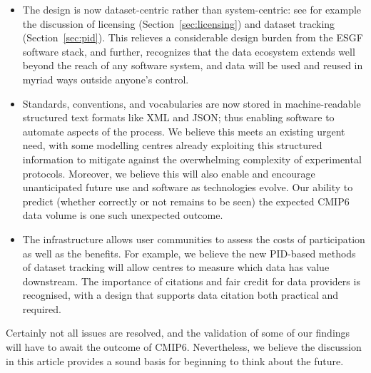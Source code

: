 \documentclass[gmd,manuscript]{copernicus}
\newcommand{\secref}[1] {\mbox{Section  \ref{sec:#1}}}
\begin{document}
\begin{itemize}
\item The design is now dataset-centric rather than system-centric:
  see for example the discussion of licensing (\secref{licensing}) and
  dataset tracking (\secref{pid}). This relieves a considerable design
  burden from the ESGF software stack, and further, recognizes that
  the data ecosystem extends well beyond the reach of any software
  system, and data will be used and reused in myriad ways outside
  anyone's control.
\item Standards, conventions, and vocabularies are now stored in
  machine-readable structured text formats like XML and JSON; thus
  enabling software to automate aspects of the process. We believe
  this meets an existing urgent need, with some modelling centres
  already exploiting this structured information to mitigate against
  the overwhelming complexity of experimental protocols. Moreover, we
  believe this will also enable and encourage unanticipated future use
  and software as technologies evolve. Our ability to predict (whether
  correctly or not remains to be seen) the expected CMIP6 data volume
  is one such unexpected outcome.
\item The infrastructure allows user communities to assess the costs
  of participation as well as the benefits. For example, we believe
  the new PID-based methods of dataset tracking will allow centres to
  measure which data has value downstream. The importance of citations
  and fair credit for data providers is recognised, with a design that
  supports data citation both practical and required.
\end{itemize}

Certainly not all issues are resolved, and the validation of some of
our findings will have to await the outcome of CMIP6. Nevertheless, we
believe the discussion in this article provides a sound basis for
beginning to think about the future.
\end{document}
